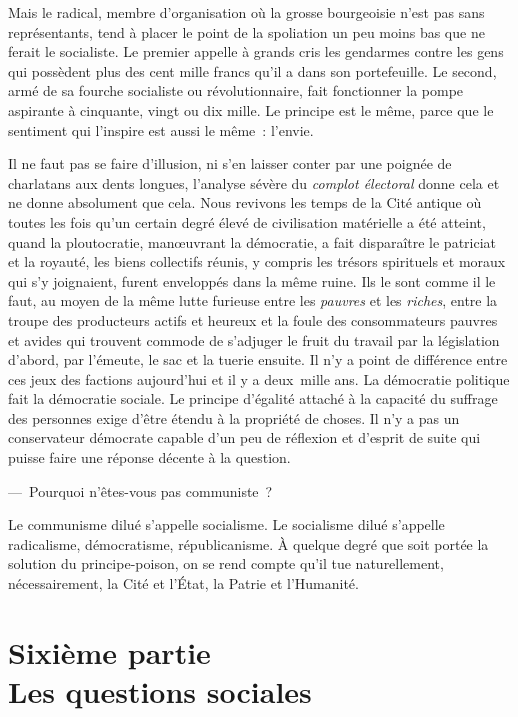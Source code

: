 \documentclass[french,twoside]{book} %
\newcommand{\astermono}{\medskip\centerline{\color{rubric}\large\selectfont{\syms ✻}}\medskip\par}%
\newcommand\chapteropen{} %
\newcommand\chapterclose{} %
\begin{document}
\astermono

\noindent Mais le radical, membre d’organisation où la grosse bourgeoisie n’est pas sans représentants, tend à placer le point de la spoliation un peu moins bas que ne ferait le socialiste. Le premier appelle à grands cris les gendarmes contre les gens qui possèdent plus des cent mille francs qu’il a dans son portefeuille. Le second, armé de sa fourche socialiste ou révolutionnaire, fait fonctionner la pompe aspirante à cinquante, vingt ou dix mille. Le principe est le même, parce que le sentiment qui l’inspire est aussi le même : l’envie.\par
Il ne faut pas se faire d’illusion, ni s’en laisser conter par une poignée de charlatans aux dents longues, l’analyse sévère du \emph{complot électoral} donne cela et ne donne absolument que cela. Nous revivons les temps de la Cité antique où toutes les fois qu’un certain degré élevé de civilisation matérielle a été atteint, quand la ploutocratie, manœuvrant la démocratie, a fait disparaître le patriciat et la royauté, les biens collectifs réunis, y compris les trésors spirituels et moraux qui s’y joignaient, furent enveloppés dans la même ruine. Ils le sont comme il le faut, au moyen de la même lutte furieuse entre les \emph{pauvres} et les \emph{riches}, entre la troupe des producteurs actifs et heureux et la foule des consommateurs pauvres et avides qui trouvent commode de s’adjuger le fruit du travail par la législation d’abord, par l’émeute, le sac et la tuerie ensuite. Il n’y a point de différence entre ces jeux des factions aujourd’hui et il y a deux mille ans. La démocratie politique fait la démocratie sociale. Le principe d’égalité attaché à la capacité du suffrage des personnes exige d’être étendu à la propriété de choses. Il n’y a pas un conservateur démocrate capable d’un peu de réflexion et d’esprit de suite qui puisse faire une réponse décente à la question.\par
— Pourquoi n’êtes-vous pas communiste ?\par
Le communisme dilué s’appelle socialisme. Le socialisme dilué s’appelle radicalisme, démocratisme, républicanisme. À quelque degré que soit portée la solution du principe-poison, on se rend compte qu’il tue naturellement, nécessairement, la Cité et l’État, la Patrie et l’Humanité.
\chapterclose


\chapteropen
\chapter[{Sixième partie. Les questions sociales}]{Sixième partie \\
Les questions sociales}\renewcommand{\leftmark}{Sixième partie \\
Les questions sociales}
\end{document}
